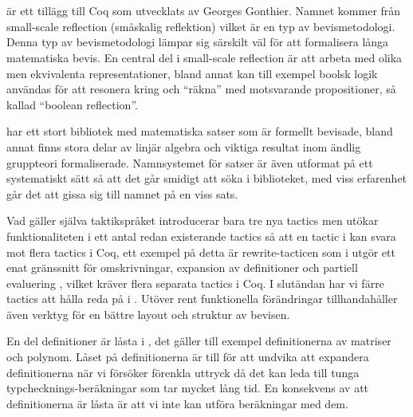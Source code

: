 \section{\ssr{}}
\ssr{} är ett tillägg till Coq som utvecklats av Georges Gonthier. Namnet
kommer från small-scale reflection (småskalig reflektion) vilket är en typ av
bevismetodologi. Denna typ av bevismetodologi lämpar sig särskilt väl för att
formalisera långa matematiska bevis. En central del i small-scale reflection är
att arbeta med olika men ekvivalenta representationer, bland annat kan till
exempel boolsk logik användas för att resonera kring och ``räkna'' med
motsvarande propositioner, så kallad ``boolean reflection''.

\ssr{} har ett stort bibliotek med matematiska satser som är formellt bevisade,
bland annat finns stora delar av linjär algebra och viktiga resultat inom
ändlig gruppteori formaliserade. Namnsystemet för satser är även utformat på
ett systematiskt sätt så att det går smidigt att söka i biblioteket, med viss
erfarenhet går det att gissa sig till namnet på en viss sats.

Vad gäller själva taktikspråket introducerar \ssr{} bara tre nya tactics men
utökar funktionaliteten i ett antal redan existerande tactics så att en tactic
i \ssr{} kan svara mot flera tactics i Coq, ett exempel på detta är
rewrite-tacticen som i \ssr{} utgör ett enat gränssnitt för omskrivningar,
expansion av definitioner och partiell evaluering \cite{gonthier2008small},
vilket kräver flera separata tactics i Coq. I slutändan har vi färre tactics
att hålla reda på i \ssr{}. Utöver rent funktionella förändringar
tillhandahåller \ssr{} även verktyg för en bättre layout och struktur av
bevisen.

En del definitioner är låsta i \ssr{}, det gäller till exempel definitionerna
av matriser och polynom. Låset på definitionerna är till för att undvika att
expandera definitionerna när vi försöker förenkla uttryck då det kan leda till
tunga typchecknings-beräkningar som tar mycket lång tid. En konsekvens av att
definitionerna är låsta är att vi inte kan utföra beräkningar med dem.
